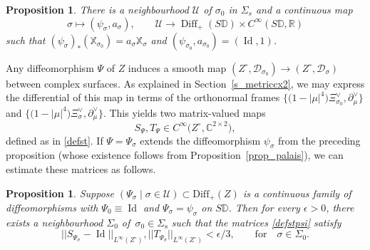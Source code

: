 \documentclass[10pt,a4paper]{amsart}
\numberwithin{equation}{section}
\newtheorem{Proposition}[Theorem]{Proposition}
\theoremstyle{definition}
\newcommand{\R}{\mathbb{R}} %
\newcommand{\C}{\mathbb{C}} %
\newcommand{\DD}{\mathbb{D}} %
\newcommand{\1}{{\bf 1}}
\newcommand{\Id}{\operatorname{Id}}
\newcommand{\D}{\mathscr{D}}
\DeclareMathOperator{\Diff}{Diff}
\begin{document}
\begin{Proposition}\label{flowback} There is a neighbourhood $\mathcal U$ of $\sigma_0$ in $\Sigma_s$ and a continuous map
\[
	\sigma \mapsto (\psi_\sigma,a_\sigma),\qquad \mathcal U\rightarrow \Diff_+(S\DD)\times C^\infty(S\DD,\R)
\]
such that $(\psi_\sigma)_*(\mathbb X_{\sigma_0})=a_\sigma \mathbb X_\sigma$ and $(\psi_{\sigma_0},a_{\sigma_0})=(\Id,1)$.
\end{Proposition}
Any diffeomorphism $\Psi$ of $Z$ induces a smooth map $(Z^\circ,\D_{\sigma_0})\rightarrow (Z^\circ,\D_\sigma)$ between complex surfaces. As explained in Section~\ref{s_metriccx2}, we may express the differential of this map in terms of the orthonormal frames $\big\{\bigl(1-|\mu|^4\bigr) \Xi_{\sigma_0}^\vee,\partial_\mu^\vee\big\}$ and $\big\{\bigl(1-|\mu|^4\bigr) \Xi_\sigma^\vee,\partial_\mu^\vee\big\}$. This yields two matrix-valued maps
\begin{equation}\label{defstpsi}
S_\Psi,T_\Psi\in C^\infty\bigl(Z^\circ,\C^{2\times 2}\bigr),
\end{equation}
defined as in \eqref{defst}. If $\Psi=\Psi_\sigma$ extends the diffeomorphism $\psi_\sigma$ from the preceding proposition (whose existence follows from Proposition~\ref{prop_palais}), we can estimate these matrices as follows.


\begin{Proposition}\label{STestimate} Suppose $(\Psi_\sigma\mid \sigma\in \mathcal U)\subset \mathrm{Diff}_+ (Z)$ is a continuous family of diffeomorphisms with $\Psi_0\equiv \Id$ and $\Psi_\sigma=\psi_\sigma$ on $S\DD$. Then for every $\epsilon >0$, there exists a neighbourhood $\Sigma_0$ of~$\sigma_0\in \Sigma_\mathrm{s}$ such that the matrices \eqref{defstpsi} satisfy
\begin{equation*}
|| S_{\Psi_\sigma} - \Id ||_{L^\infty(Z^\circ)}, || T_{\Psi_\sigma} ||_{L^\infty(Z^\circ)} <\epsilon/3,\qquad \text{for}\quad \sigma \in \Sigma_0.
\end{equation*}
\end{Proposition}
\end{document}
